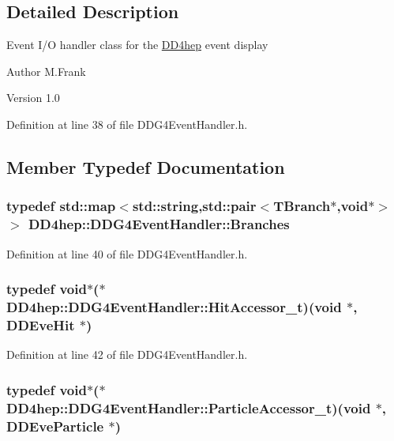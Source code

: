 \subsection{Detailed Description}
Event I/O handler class for the \hyperlink{namespace_d_d4hep}{DD4hep} event display

\begin{DoxyAuthor}{Author}
M.Frank 
\end{DoxyAuthor}
\begin{DoxyVersion}{Version}
1.0 
\end{DoxyVersion}


Definition at line 38 of file DDG4EventHandler.h.

\subsection{Member Typedef Documentation}
\hypertarget{class_d_d4hep_1_1_d_d_g4_event_handler_accd112cdbf8673e3a80d97e2d5c98241}{
\subsubsection[{Branches}]{\setlength{\rightskip}{0pt plus 5cm}typedef std::map$<$std::string,std::pair$<$TBranch$\ast$,void$\ast$$>$ $>$ {\bf DD4hep::DDG4EventHandler::Branches}}}
\label{class_d_d4hep_1_1_d_d_g4_event_handler_accd112cdbf8673e3a80d97e2d5c98241}


Definition at line 40 of file DDG4EventHandler.h.\hypertarget{class_d_d4hep_1_1_d_d_g4_event_handler_a2f34a2e7c2b1a6cb2c9fc1b7270d707e}{
\subsubsection[{HitAccessor\_\-t}]{\setlength{\rightskip}{0pt plus 5cm}typedef void$\ast$($\ast$ {\bf DD4hep::DDG4EventHandler::HitAccessor\_\-t})(void $\ast$, {\bf DDEveHit} $\ast$)}}
\label{class_d_d4hep_1_1_d_d_g4_event_handler_a2f34a2e7c2b1a6cb2c9fc1b7270d707e}


Definition at line 42 of file DDG4EventHandler.h.\hypertarget{class_d_d4hep_1_1_d_d_g4_event_handler_a5d1ac46722967ffdd5e1a15147d3c6bb}{
\subsubsection[{ParticleAccessor\_\-t}]{\setlength{\rightskip}{0pt plus 5cm}typedef void$\ast$($\ast$ {\bf DD4hep::DDG4EventHandler::ParticleAccessor\_\-t})(void $\ast$, {\bf DDEveParticle} $\ast$)}}
\label{class_d_d4hep_1_1_d_d_g4_event_handler_a5d1ac46722967ffdd5e1a15147d3c6bb}


